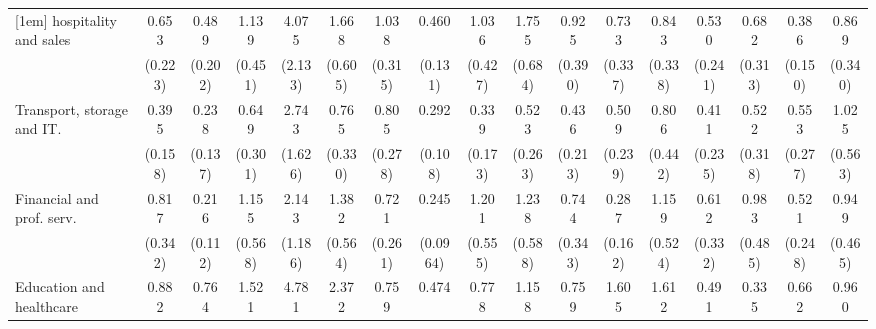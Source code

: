 {\begin{tabular}{l*{16}{c}}
[1em]
hospitality and sales&       0.653         &       0.489         &       1.139         &       4.075\sym{**} &       1.668         &       1.038         &       0.460\sym{**} &       1.036         &       1.755         &       0.925         &       0.733         &       0.843         &       0.530         &       0.682         &       0.386\sym{*}  &       0.869         \\
                    &     (0.223)         &     (0.202)         &     (0.451)         &     (2.133)         &     (0.605)         &     (0.315)         &     (0.131)         &     (0.427)         &     (0.684)         &     (0.390)         &     (0.337)         &     (0.338)         &     (0.241)         &     (0.313)         &     (0.150)         &     (0.340)         \\
[1em]
Transport, storage and IT.&       0.395\sym{*}  &       0.238\sym{*}  &       0.649         &       2.743         &       0.765         &       0.805         &       0.292\sym{***}&       0.339\sym{*}  &       0.523         &       0.436         &       0.509         &       0.806         &       0.411         &       0.522         &       0.553         &       1.025         \\
                    &     (0.158)         &     (0.137)         &     (0.301)         &     (1.626)         &     (0.330)         &     (0.278)         &     (0.108)         &     (0.173)         &     (0.263)         &     (0.213)         &     (0.239)         &     (0.442)         &     (0.235)         &     (0.318)         &     (0.277)         &     (0.563)         \\
[1em]
Financial and prof. serv.&       0.817         &       0.216\sym{**} &       1.155         &       2.143         &       1.382         &       0.721         &       0.245\sym{***}&       1.201         &       1.238         &       0.744         &       0.287\sym{*}  &       1.159         &       0.612         &       0.983         &       0.521         &       0.949         \\
                    &     (0.342)         &     (0.112)         &     (0.568)         &     (1.186)         &     (0.564)         &     (0.261)         &    (0.0964)         &     (0.555)         &     (0.588)         &     (0.343)         &     (0.162)         &     (0.524)         &     (0.332)         &     (0.485)         &     (0.248)         &     (0.465)         \\
[1em]
Education and healthcare&       0.882         &       0.764         &       1.521         &       4.781\sym{**} &       2.372\sym{*}  &       0.759         &       0.474         &       0.778         &       1.158         &       0.759         &       1.605         &       1.612         &       0.491         &       0.335\sym{*}  &       0.662         &       0.960         \\

\end{tabular}}
